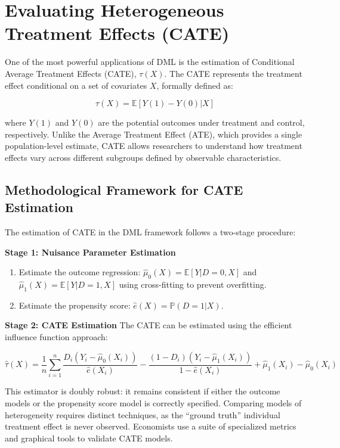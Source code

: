 \documentclass[12pt,a4paper]{article}
\begin{document}
\section{Evaluating Heterogeneous Treatment Effects (CATE)}

One of the most powerful applications of DML is the estimation of Conditional Average Treatment Effects (CATE), $\tau(X)$. The CATE represents the treatment effect conditional on a set of covariates $X$, formally defined as:

\begin{equation}
\tau(X) = \mathbb{E}[Y(1) - Y(0) | X]
\end{equation}

where $Y(1)$ and $Y(0)$ are the potential outcomes under treatment and control, respectively. Unlike the Average Treatment Effect (ATE), which provides a single population-level estimate, CATE allows researchers to understand how treatment effects vary across different subgroups defined by observable characteristics.

\subsection{Methodological Framework for CATE Estimation}

The estimation of CATE in the DML framework follows a two-stage procedure:

\textbf{Stage 1: Nuisance Parameter Estimation}
\begin{enumerate}
\item Estimate the outcome regression: $\hat{\mu}_0(X) = \mathbb{E}[Y | D=0, X]$ and $\hat{\mu}_1(X) = \mathbb{E}[Y | D=1, X]$ using cross-fitting to prevent overfitting.
\item Estimate the propensity score: $\hat{e}(X) = \mathbb{P}(D=1 | X)$.
\end{enumerate}

\textbf{Stage 2: CATE Estimation}
The CATE can be estimated using the efficient influence function approach:

\begin{equation}
\hat{\tau}(X) = \frac{1}{n} \sum_{i=1}^{n} \frac{D_i(Y_i - \hat{\mu}_0(X_i))}{\hat{e}(X_i)} - \frac{(1-D_i)(Y_i - \hat{\mu}_1(X_i))}{1-\hat{e}(X_i)} + \hat{\mu}_1(X_i) - \hat{\mu}_0(X_i)
\end{equation}

This estimator is doubly robust: it remains consistent if either the outcome models or the propensity score model is correctly specified. Comparing models of heterogeneity requires distinct techniques, as the ``ground truth'' individual treatment effect is never observed. Economists use a suite of specialized metrics and graphical tools to validate CATE models.
\end{document}
